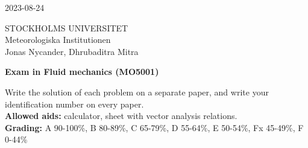 \documentclass[12pt,a4paper]{article}
\begin{document}
\begin{center}
2023-08-24
\end{center}
STOCKHOLMS UNIVERSITET\\
Meteorologiska Institutionen\\
Jonas Nycander, Dhrubaditra Mitra\\
\vspace{1cm}

\begin{center}
{\bf\large Exam in Fluid mechanics (MO5001)}\\
\end{center}

Write the solution of each problem on a separate paper, and write your identification number on every paper.\\

{\bf Allowed aids:} calculator, sheet with vector analysis relations.\\

{\bf Grading:} A 90-100\%, B 80-89\%, C 65-79\%, D 55-64\%, E 50-54\%, Fx 45-49\%, F 0-44\% \\
\vspace{0.5cm}
\end{document}
